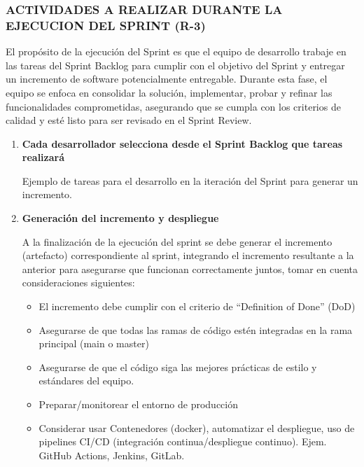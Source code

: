 \begin{doublespace}

\clearpage  %

\subsubsection{ACTIVIDADES A REALIZAR DURANTE LA EJECUCION DEL SPRINT (R-3)}
El propósito de la ejecución del Sprint es que el equipo de desarrollo trabaje en las tareas del
Sprint Backlog para cumplir con el objetivo del Sprint y entregar un incremento de software
potencialmente entregable. Durante esta fase, el equipo se enfoca en consolidar la solución,
implementar, probar y refinar las funcionalidades comprometidas, asegurando que se cumpla
con los criterios de calidad y esté listo para ser revisado en el Sprint Review.

\begin{enumerate}[label=\alph*)]
    \item \textbf{Cada desarrollador selecciona desde el Sprint Backlog que tareas realizará}\par
    Ejemplo de tareas para el desarrollo en la iteración del Sprint para generar un incremento.
    \item \textbf{Generación del incremento y despliegue}\par
    A la finalización de la ejecución del sprint se debe generar el incremento (artefacto)
    correspondiente al sprint, integrando el incremento resultante a la anterior para asegurarse
    que funcionan correctamente juntos, tomar en cuenta consideraciones siguientes:
    \begin{itemize}
        \item El incremento debe cumplir con el criterio de “Definition of Done” (DoD)
        \item Asegurarse de que todas las ramas de código estén integradas en la rama principal (main
        o master)
        \item Asegurarse de que el código siga las mejores prácticas de estilo y estándares del equipo.
        \item Preparar/monitorear el entorno de producción
        \item Considerar usar Contenedores (docker), automatizar el despliegue, uso de pipelines
        CI/CD (integración continua/despliegue continuo). Ejem. GitHub Actions, Jenkins, GitLab.
    \end{itemize}
\end{enumerate}

\end{doublespace}
